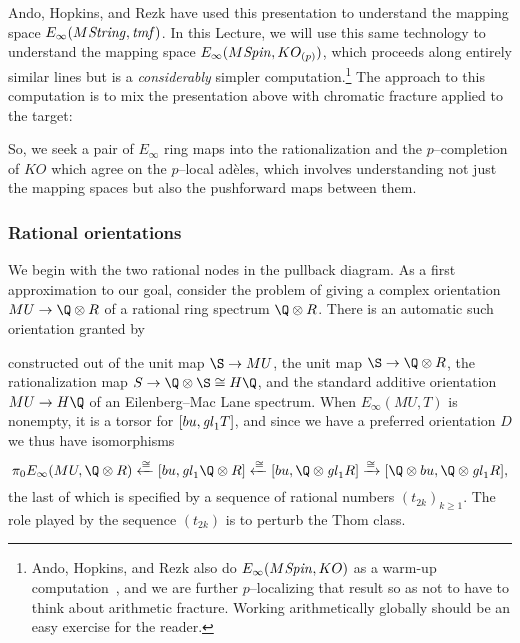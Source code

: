 Ando, Hopkins, and Rezk have used this presentation to understand the mapping space $E_\infty(M\mathit{String}, \mathit{tmf})$.  In this Lecture, we will use this same technology to understand the mapping space $E_\infty(M\mathit{Spin}, KO_{(p)})$, which proceeds along entirely similar lines but is a \emph{considerably} simpler computation.\footnote{Ando, Hopkins, and Rezk also do $E_\infty(M\mathit{Spin}, KO)$ as a warm-up computation~\cite[Section 7]{AHR}, and we are further $p$--localizing that result so as not to have to think about arithmetic fracture.  Working arithmetically globally should be an easy exercise for the reader.}  The approach to this computation is to mix the presentation above with chromatic fracture applied to the target:
\begin{center}
\end{center}
So, we seek a pair of $E_\infty$ ring maps into the rationalization and the $p$--completion of $KO$ which agree on the $p$--local ad\`eles, which involves understanding not just the mapping spaces but also the pushforward maps between them.


\subsubsection{Rational orientations}

We begin with the two rational nodes in the pullback diagram.  As a first approximation to our goal, consider the problem of giving a complex orientation $MU \to \Q \otimes R$ of a rational ring spectrum $\Q \otimes R$.  There is an automatic such orientation granted by
\begin{center}
\end{center}
constructed out of the unit map $\S \to MU$, the unit map $\S \to \Q \otimes R$, the rationalization map $S \to \Q \otimes \S \cong H\Q$, and the standard additive orientation $MU \to H\Q$ of an Eilenberg--Mac Lane spectrum.  When $E_\infty(MU, T)$ is nonempty, it is a torsor for $[bu, \mathit{gl}_1 T]$, and since we have a preferred orientation $D$ we thus have isomorphisms \[\pi_0 E_\infty(MU, \Q \otimes R) \xleftarrow{\cong} [bu, \gl_1 \Q \otimes R] \xleftarrow{\cong} [bu, \Q \otimes \gl_1 R] \xrightarrow{\cong} [\Q \otimes bu, \Q \otimes \gl_1 R],\] the last of which is specified by a sequence of rational numbers $(t_{2k})_{k \ge 1}$.  The role played by the sequence $(t_{2k})$ is to perturb the Thom class.

